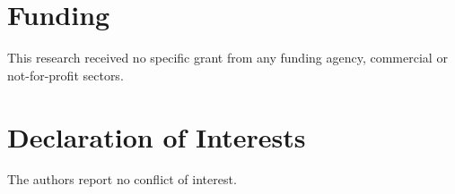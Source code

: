 \documentclass{jfm}
\begin{document}
\section*{Funding} 
This research received no specific grant from any funding agency, commercial or not-for-profit sectors.

\section*{Declaration of Interests} 
The authors report no conflict of interest.




\end{document}
